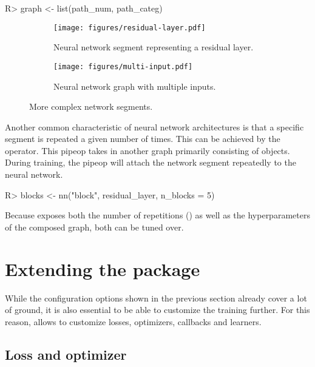 \documentclass[article]{jss}
\theoremstyle{definition}
\begin{document}
\begin{CodeInput}
R> graph <- list(path_num, path_categ) %
\end{CodeInput}

\begin{figure}[h]
    \centering
    \begin{subfigure}{0.38\textwidth}
        \centering
        \texttt{[image: figures/residual-layer.pdf]}
        \caption{Neural network segment representing a residual layer.}
        \label{fig:residual-layer}
    \end{subfigure}
    \hfill
    \begin{subfigure}{0.58\textwidth}
        \centering
        \texttt{[image: figures/multi-input.pdf]}
        \caption{Neural network graph with multiple inputs.}
        \label{fig:multi-inputs}
    \end{subfigure}
    \caption{More complex network segments.}
    \label{fig:side-by-side}
\end{figure}

Another common characteristic of neural network architectures is that a specific segment is repeated a given number of times.
This can be achieved by the  operator.
This pipeop takes in another graph primarily consisting of  objects.
During training, the pipeop will attach the network segment repeatedly to the neural network.

\begin{CodeInput}
R> blocks <- nn("block", residual_layer, n_blocks = 5)
\end{CodeInput}

Because  exposes both the number of repetitions () as well as the hyperparameters of the composed graph, both can be tuned over.

\section{Extending the package}\label{sec:extending}

While the configuration options shown in the previous section already cover a lot of ground, it is also essential to be able to customize the training further.
For this reason,  allows to customize losses, optimizers, callbacks and learners.

\subsection{Loss and optimizer}\label{sec:extending-loss-opt}
\end{document}
